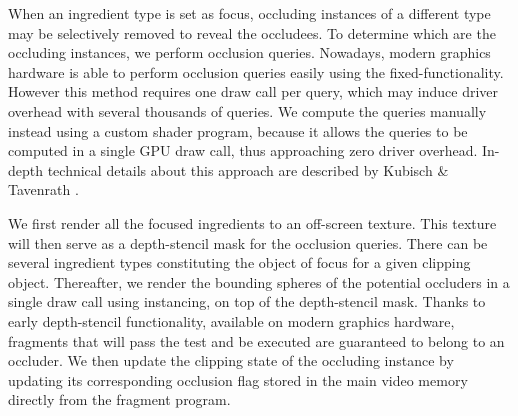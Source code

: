 When an ingredient type is set as focus, occluding instances of a different type may be selectively removed to reveal the occludees.
To determine which are the occluding instances, we perform occlusion queries. 
Nowadays, modern graphics hardware is able to perform occlusion queries easily using the fixed-functionality.
However this method requires one draw call per query, which may induce driver overhead with several thousands of queries.
We compute the queries manually instead using a custom shader program, because it allows the queries to be computed in a single GPU draw call, thus approaching zero driver overhead.
In-depth technical details about this approach are described by Kubisch \& Tavenrath \cite{kubisch2014opengl}.

We first render all the focused ingredients to an off-screen texture. 
This texture will then serve as a depth-stencil mask for the occlusion queries.
There can be several ingredient types constituting the object of focus for a given clipping object.
Thereafter, we render the bounding spheres of the potential occluders in a single draw call using instancing, on top of the depth-stencil mask.
Thanks to early depth-stencil functionality, available on modern graphics hardware, fragments that will pass the test and be executed are guaranteed to belong to an occluder.
We then update the clipping state of the occluding instance by updating its corresponding occlusion flag stored in the main video memory directly from the fragment program.


